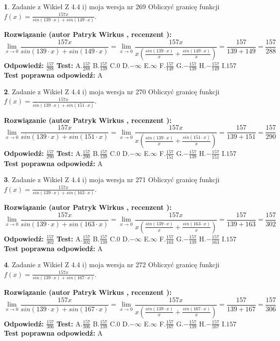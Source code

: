 \documentclass[12pt, a4paper]{article}
\theoremstyle{definition} %
\newtheorem{zad}{}
\newcommand{\zadStart}[1]{\begin{zad}#1\newline}
\newcommand{\zadStop}{\end{zad}}
\newcommand{\rozwStart}[2]{\noindent \textbf{Rozwiązanie (autor #1 , recenzent #2): }\newline}
\newcommand{\rozwStop}{\newline}
\newcommand{\odpStart}{\noindent \textbf{Odpowiedź:}\newline}
\newcommand{\odpStop}{\newline}
\newcommand{\testStart}{\noindent \textbf{Test:}\newline}
\newcommand{\testStop}{\newline}
\newcommand{\kluczStart}{\noindent \textbf{Test poprawna odpowiedź:}\newline}
\newcommand{\kluczStop}{\newline}
\begin{document}
\zadStart{Zadanie z Wikieł Z 4.4 i) moja wersja nr 269}
Obliczyć granicę funkcji $f(x)=\frac{157x}{sin(139\cdot x) +sin(149\cdot x)}$.
\zadStop
\rozwStart{Patryk Wirkus}{}
$$\lim\limits_{x\to 0}\frac{157x}{sin(139\cdot x) +sin(149\cdot x)}=\lim\limits_{x\to 0}\frac{157x}{x(\frac{sin(139\cdot x)}{x}+\frac{sin(149\cdot x)}{x})}=\frac{157}{139+149} = \frac{157}{288}$$
\rozwStop
\odpStart
$\frac{157}{288}$
\odpStop
\testStart
A.$\frac{157}{288}$
B.$\frac{157}{139}$
C.$0$
D.$-\infty$
E.$\infty$
F.$\frac{157}{149}$
G.$-\frac{157}{139}$
H.$-\frac{157}{149}$
I.$157$
\testStop
\kluczStart
A
\kluczStop



\zadStart{Zadanie z Wikieł Z 4.4 i) moja wersja nr 270}
Obliczyć granicę funkcji $f(x)=\frac{157x}{sin(139\cdot x) +sin(151\cdot x)}$.
\zadStop
\rozwStart{Patryk Wirkus}{}
$$\lim\limits_{x\to 0}\frac{157x}{sin(139\cdot x) +sin(151\cdot x)}=\lim\limits_{x\to 0}\frac{157x}{x(\frac{sin(139\cdot x)}{x}+\frac{sin(151\cdot x)}{x})}=\frac{157}{139+151} = \frac{157}{290}$$
\rozwStop
\odpStart
$\frac{157}{290}$
\odpStop
\testStart
A.$\frac{157}{290}$
B.$\frac{157}{139}$
C.$0$
D.$-\infty$
E.$\infty$
F.$\frac{157}{151}$
G.$-\frac{157}{139}$
H.$-\frac{157}{151}$
I.$157$
\testStop
\kluczStart
A
\kluczStop



\zadStart{Zadanie z Wikieł Z 4.4 i) moja wersja nr 271}
Obliczyć granicę funkcji $f(x)=\frac{157x}{sin(139\cdot x) +sin(163\cdot x)}$.
\zadStop
\rozwStart{Patryk Wirkus}{}
$$\lim\limits_{x\to 0}\frac{157x}{sin(139\cdot x) +sin(163\cdot x)}=\lim\limits_{x\to 0}\frac{157x}{x(\frac{sin(139\cdot x)}{x}+\frac{sin(163\cdot x)}{x})}=\frac{157}{139+163} = \frac{157}{302}$$
\rozwStop
\odpStart
$\frac{157}{302}$
\odpStop
\testStart
A.$\frac{157}{302}$
B.$\frac{157}{139}$
C.$0$
D.$-\infty$
E.$\infty$
F.$\frac{157}{163}$
G.$-\frac{157}{139}$
H.$-\frac{157}{163}$
I.$157$
\testStop
\kluczStart
A
\kluczStop



\zadStart{Zadanie z Wikieł Z 4.4 i) moja wersja nr 272}
Obliczyć granicę funkcji $f(x)=\frac{157x}{sin(139\cdot x) +sin(167\cdot x)}$.
\zadStop
\rozwStart{Patryk Wirkus}{}
$$\lim\limits_{x\to 0}\frac{157x}{sin(139\cdot x) +sin(167\cdot x)}=\lim\limits_{x\to 0}\frac{157x}{x(\frac{sin(139\cdot x)}{x}+\frac{sin(167\cdot x)}{x})}=\frac{157}{139+167} = \frac{157}{306}$$
\rozwStop
\odpStart
$\frac{157}{306}$
\odpStop
\testStart
A.$\frac{157}{306}$
B.$\frac{157}{139}$
C.$0$
D.$-\infty$
E.$\infty$
F.$\frac{157}{167}$
G.$-\frac{157}{139}$
H.$-\frac{157}{167}$
I.$157$
\testStop
\kluczStart
A
\kluczStop
\end{document}
